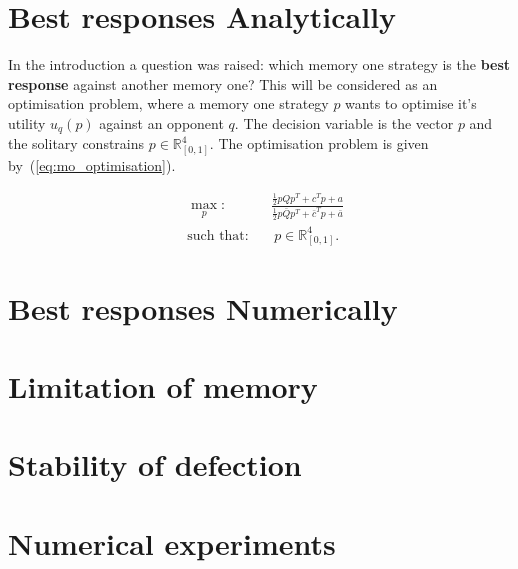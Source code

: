 \documentclass[10pt]{article}
\newcommand{\R}{\mathbb{R}}
\begin{document}
\section{Best responses Analytically}

In the introduction a question was raised: which memory one strategy is the \textbf{best response}
against another memory one? This will be considered as an optimisation problem,
where a memory one strategy \(p\) wants to optimise it's utility \(u_q(p)\)
against an opponent \(q\). The decision variable is the vector \(p\) and the 
solitary constrains \(p \in \R^4_{[0, 1]} \). The optimisation problem is 
given by~(\ref{eq:mo_optimisation}).

\begin{equation}\label{eq:mo_optimisation}
\begin{aligned}
& \max_p: && \frac{\frac{1}{2}  p  Q  p^T + c^T p + a} 
                  {\frac{1}{2}  p  \bar{Q}  p^T + \bar{c}^T  p + \bar{a}}
\\
& \text{such that}: && \ p \in \R^4_{[0, 1]}.
\end{aligned}
\end{equation}




\section{Best responses Numerically}

\section{Limitation of memory}

\section{Stability of defection}

\section{Numerical experiments}



\end{document}
